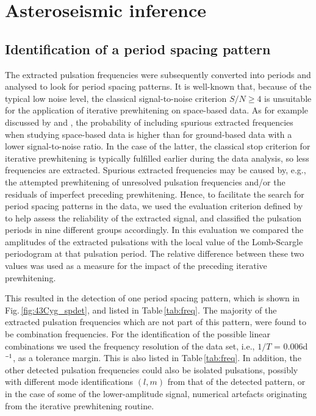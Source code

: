 \documentclass{aa}
\def\cd{d$^{\rm -1}$}
\begin{document}
\section{Asteroseismic inference}
\label{sec:asteroseismic}


\subsection{Identification of a period spacing pattern}
The extracted pulsation frequencies were subsequently converted into periods and analysed to look for period spacing patterns. It is well-known that, because of the typical low noise level, the classical signal-to-noise criterion $S/N\geq4$ is unsuitable for the application of iterative prewhitening on space-based data. 
As for example discussed by \citet{balona2014} and \citet{baran2015}, 
the probability of including spurious extracted frequencies when 
studying space-based data is higher than for ground-based data with 
a lower signal-to-noise ratio. In the case of the latter, the 
classical stop criterion for iterative prewhitening is typically 
fulfilled earlier during the data analysis, so less frequencies are extracted. Spurious extracted frequencies may be 
caused by, e.g., the attempted prewhitening of unresolved pulsation 
frequencies and/or the residuals of imperfect preceding prewhitening. 
Hence, to facilitate the search for period spacing patterns in the data, 
we used the evaluation criterion defined by \citet{vanreeth2015aa} to 
help assess the reliability of the extracted signal, and classified the 
pulsation periods in nine different groups accordingly. In this 
evaluation we compared the amplitudes of the extracted pulsations with 
the local value of the Lomb-Scargle periodogram at that pulsation period. 
The relative difference between these two values was used as a measure 
for the impact of the preceding iterative prewhitening.


This resulted in the detection of one period spacing pattern, which is shown in Fig.\,\ref{fig:43Cyg_spdet}, and listed in Table\,\ref{tab:freq}. The majority of the extracted pulsation frequencies which are not part of this pattern, were found to be combination frequencies. For the identification of the possible linear combinations we used the frequency resolution of the data set, i.e., $1/T$ = 0.006\cd, as a tolerance margin. This is also listed in Table\,\ref{tab:freq}. In addition, the other detected pulsation frequencies could also be isolated pulsations, possibly with different mode identifications $(l,m)$ from that of the detected pattern, or in the case of some of the lower-amplitude signal, numerical artefacts originating from the iterative prewhitening routine.
\end{document}
